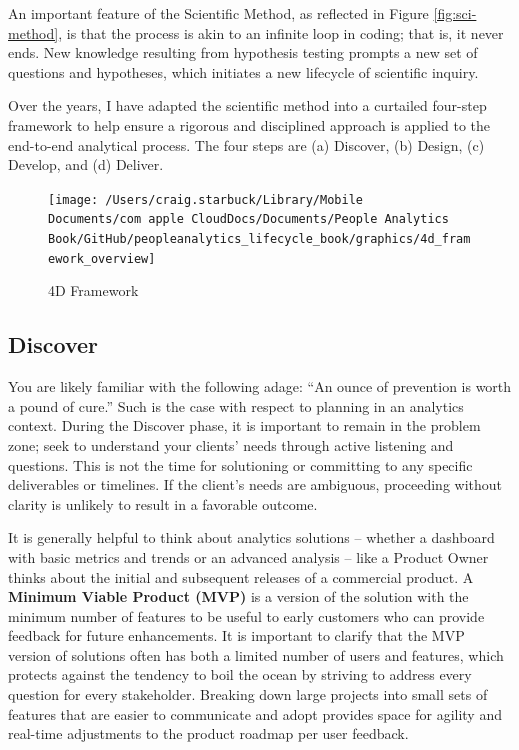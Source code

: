 \documentclass[]{book}
\begin{document}
An important feature of the Scientific Method, as reflected in Figure \ref{fig:sci-method}, is that the process is akin to an infinite loop in coding; that is, it never ends. New knowledge resulting from hypothesis testing prompts a new set of questions and hypotheses, which initiates a new lifecycle of scientific inquiry.

Over the years, I have adapted the scientific method into a curtailed four-step framework to help ensure a rigorous and disciplined approach is applied to the end-to-end analytical process. The four steps are (a) Discover, (b) Design, (c) Develop, and (d) Deliver.

\begin{figure}

{\centering \texttt{[image: /Users/craig.starbuck/Library/Mobile Documents/com~apple~CloudDocs/Documents/People Analytics Book/GitHub/peopleanalytics\_lifecycle\_book/graphics/4d\_framework\_overview]} 

}

\caption{4D Framework}\label{fig:4d-framework}
\end{figure}

\hypertarget{discover}{%
\subsection{Discover}\label{discover}}

You are likely familiar with the following adage: ``An ounce of prevention is worth a pound of cure.'' Such is the case with respect to planning in an analytics context. During the Discover phase, it is important to remain in the problem zone; seek to understand your clients' needs through active listening and questions. This is not the time for solutioning or committing to any specific deliverables or timelines. If the client's needs are ambiguous, proceeding without clarity is unlikely to result in a favorable outcome.

It is generally helpful to think about analytics solutions -- whether a dashboard with basic metrics and trends or an advanced analysis -- like a Product Owner thinks about the initial and subsequent releases of a commercial product. A \textbf{Minimum Viable Product (MVP)} is a version of the solution with the minimum number of features to be useful to early customers who can provide feedback for future enhancements. It is important to clarify that the MVP version of solutions often has both a limited number of users and features, which protects against the tendency to boil the ocean by striving to address every question for every stakeholder. Breaking down large projects into small sets of features that are easier to communicate and adopt provides space for agility and real-time adjustments to the product roadmap per user feedback.
\end{document}
